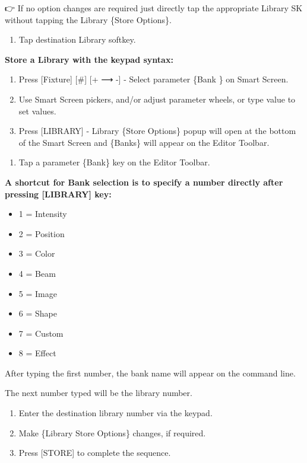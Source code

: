 \documentclass[
]{article}
\providecommand{\tightlist}{%
  \setlength{\itemsep}{0pt}\setlength{\parskip}{0pt}}
\begin{document}
👉 If no option changes are required just directly tap the appropriate Library SK without tapping the Library \{Store Options\}.

\begin{enumerate}
\def\labelenumi{\arabic{enumi}.}
\setcounter{enumi}{3}
\tightlist
\item
  Tap destination Library softkey.
\end{enumerate}

\textbf{Store a Library with the keypad syntax:}

\begin{enumerate}
\def\labelenumi{\arabic{enumi}.}
\item
  Press {[}Fixture{]} {[}\#{]} {[}+ ⟶ -{]} - Select parameter \{Bank \} on Smart Screen.
\item
  Use Smart Screen pickers, and/or adjust parameter wheels, or type value to set values.
\item
  Press {[}LIBRARY{]} - Library \{Store Options\} popup will open at the bottom of the Smart Screen and \{Banks\} will appear on the Editor Toolbar.
\end{enumerate}

\begin{enumerate}
\def\labelenumi{\arabic{enumi}.}
\setcounter{enumi}{3}
\tightlist
\item
  Tap a parameter \{Bank\} key on the Editor Toolbar.
\end{enumerate}

\textbf{A shortcut for Bank selection is to specify a number directly after pressing {[}LIBRARY{]} key:}

\begin{itemize}
\item
  1 = Intensity
\item
  2 = Position
\item
  3 = Color
\item
  4 = Beam
\item
  5 = Image
\item
  6 = Shape
\item
  7 = Custom
\item
  8 = Effect
\end{itemize}

After typing the first number, the bank name will appear on the command line.

The next number typed will be the library number.

\begin{enumerate}
\def\labelenumi{\arabic{enumi}.}
\setcounter{enumi}{4}
\item
  Enter the destination library number via the keypad.
\item
  Make \{Library Store Options\} changes, if required.
\item
  Press {[}STORE{]} to complete the sequence.
\end{enumerate}
\end{document}
